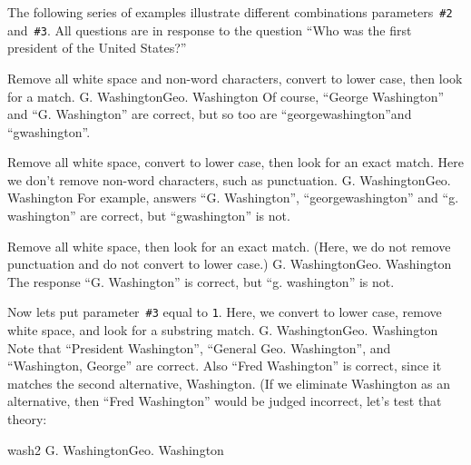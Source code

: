 \documentclass{article}
\begin{document}
\makeatletter
\renewcommand\sqlabel[1]{\@gobble}
\makeatother
\begin{shortquiz}[comboexamp]%
The following series of examples illustrate different combinations
parameters~\texttt{\#2} and~\texttt{\#3}.  All questions are in
response to the question ``Who was the first president of the
United States?''
\begin{questions}
\item Remove all white space and non-word characters, convert to lower case,
then look for a match.
    {G. Washington}{Geo. Washington}
Of course, ``George Washington'' and ``G. Washington'' are correct, but
so too are ``georgewashington''and ``gwashington''.

\item Remove all white space, convert to lower case, then look for an
exact match. Here we don't remove non-word characters, such as punctuation.
    {G. Washington}{Geo. Washington}
For example, answers ``G. Washington'', ``georgewashington'' and
``g. washington'' are correct, but ``gwashington'' is not.

\item Remove all white space, then look for an exact match. (Here,
we do not remove punctuation and do not convert to lower case.)
    {G. Washington}{Geo. Washington} The
response ``G. Washington'' is correct, but ``g. washington'' is not.

\item Now lets put parameter~\texttt{\#3} equal to \texttt1. Here, we convert
to lower case, remove white space, and look for a substring match.
    {G. Washington}{Geo. Washington} Note that ``President Washington'',
``General Geo. Washington'', and ``Washington, George'' are correct.
Also ``Fred Washington'' is correct, since it matches the second
alternative, Washington. (If we eliminate Washington as an
alternative, then ``Fred Washington'' would be judged incorrect,
let's test that theory:
\begin{oQuestion}{wash2}
{G. Washington}{Geo. Washington}\end{oQuestion}
\end{questions}
\end{shortquiz}
\end{document}
